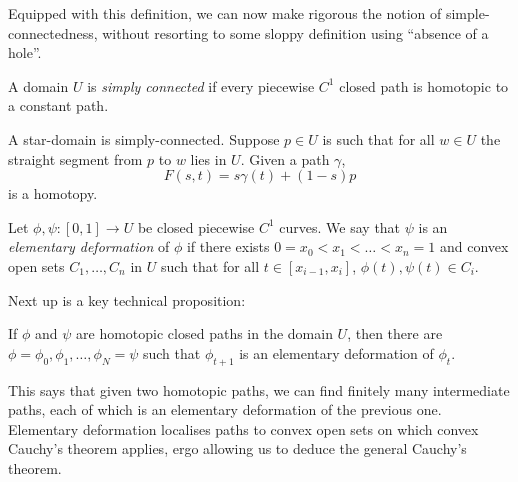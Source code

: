 \documentclass[a4paper]{article}
\begin{document}
Equipped with this definition, we can now make rigorous the notion of simple-connectedness, without resorting to some sloppy definition using ``absence of a hole''.

\begin{definition}
  A domain \(U\) is \emph{simply connected} if every piecewise \(C^1\) closed path is homotopic to a constant path.
\end{definition}

\begin{eg}
  A star-domain is simply-connected. Suppose \(p \in U\) is such that for all \(w \in U\) the straight segment from \(p\) to \(w\) lies in \(U\). Given a path \(\gamma\),
  \[
    F(s, t) = s \gamma(t) + (1 - s)p
  \]
  is a homotopy.
\end{eg}

\begin{definition}
  Let \(\phi, \psi: [0, 1] \to U\) be closed piecewise \(C^1\) curves. We say that \(\psi\) is an \emph{elementary deformation} of \(\phi\) if there exists \(0 = x_0 < x_1 < \dots < x_n = 1\) and convex open sets \(C_1, \dots, C_n\) in \(U\) such that for all \(t \in [x_{i - 1}, x_i]\), \(\phi(t), \psi(t) \in C_i\).
\end{definition}

Next up is a key technical proposition:

\begin{proposition}
  If \(\phi\) and \(\psi\) are homotopic closed paths in the domain \(U\), then there are \(\phi = \phi_0, \phi_1, \dots, \phi_N = \psi\) such that \(\phi_{t + 1}\) is an elementary deformation of \(\phi_t\).
\end{proposition}

This says that given two homotopic paths, we can find finitely many intermediate paths, each of which is an elementary deformation of the previous one. Elementary deformation localises paths to convex open sets on which convex Cauchy's theorem applies, ergo allowing us to deduce the general Cauchy's theorem.
\end{document}

